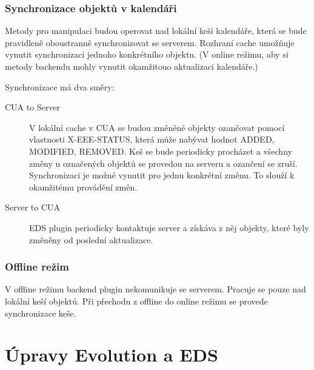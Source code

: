 \documentclass[a4paper,10pt]{article}
\begin{document}
\begin{multicols*}{2}
\subsubsection{Synchronizace objektů v kalendáři}

Metody pro manipulaci budou operovat nad lokální keší kalendáře, která se bude
pravidleně oboustranně synchronizovat se serverem. Rozhraní cache umožňuje
vynutit synchronizaci jednoho konkrétního objektu. (V online režimu, aby si
metody backendu mohly vynutit okamžitouo aktualizaci kalendáře.)

Synchronizace má dva směry:
\begin{description}
\item[CUA to Server] V lokální cache v CUA se budou změněné objekty ozančovat
pomocí vlastnosti X-EEE-STATUS, která může nabývat hodnot ADDED, MODIFIED,
REMOVED. Keš se bude periodicky procházet a všechny změny u označených objektů
se provedou na serveru a ozančení se zruší. Synchronizaci je možné vynutit
pro jednu konkrétní změnu. To slouží k okamžitému provádění změn.
\item[Server to CUA] EDS plugin periodicky kontaktuje server a získáva z něj
objekty, které byly změněny od poslední aktualizace.
\end{description}

\subsubsection{Offline režim}

V offline režimu backend plugin nekomunikuje se serverem. Pracuje se pouze nad
lokální keší objektů. Při přechodu z offline do online režimu se provede
synchronizace keše.

\section{Úpravy Evolution a EDS}


\end{multicols*}
\end{document}
